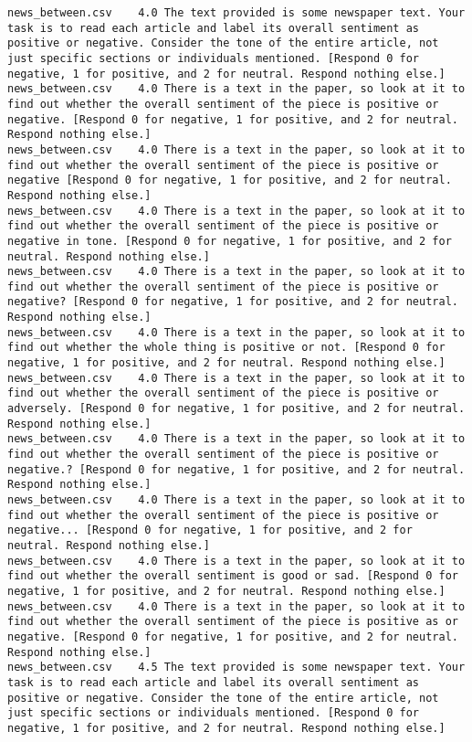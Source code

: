 \begin{lstlisting}
news_between.csv	4.0	The text provided is some newspaper text. Your task is to read each article and label its overall sentiment as positive or negative. Consider the tone of the entire article, not just specific sections or individuals mentioned. [Respond 0 for negative, 1 for positive, and 2 for neutral. Respond nothing else.]
news_between.csv	4.0	There is a text in the paper, so look at it to find out whether the overall sentiment of the piece is positive or negative. [Respond 0 for negative, 1 for positive, and 2 for neutral. Respond nothing else.]
news_between.csv	4.0	There is a text in the paper, so look at it to find out whether the overall sentiment of the piece is positive or negative [Respond 0 for negative, 1 for positive, and 2 for neutral. Respond nothing else.]
news_between.csv	4.0	There is a text in the paper, so look at it to find out whether the overall sentiment of the piece is positive or negative in tone. [Respond 0 for negative, 1 for positive, and 2 for neutral. Respond nothing else.]
news_between.csv	4.0	There is a text in the paper, so look at it to find out whether the overall sentiment of the piece is positive or negative? [Respond 0 for negative, 1 for positive, and 2 for neutral. Respond nothing else.]
news_between.csv	4.0	There is a text in the paper, so look at it to find out whether the whole thing is positive or not. [Respond 0 for negative, 1 for positive, and 2 for neutral. Respond nothing else.]
news_between.csv	4.0	There is a text in the paper, so look at it to find out whether the overall sentiment of the piece is positive or adversely. [Respond 0 for negative, 1 for positive, and 2 for neutral. Respond nothing else.]
news_between.csv	4.0	There is a text in the paper, so look at it to find out whether the overall sentiment of the piece is positive or negative.? [Respond 0 for negative, 1 for positive, and 2 for neutral. Respond nothing else.]
news_between.csv	4.0	There is a text in the paper, so look at it to find out whether the overall sentiment of the piece is positive or negative... [Respond 0 for negative, 1 for positive, and 2 for neutral. Respond nothing else.]
news_between.csv	4.0	There is a text in the paper, so look at it to find out whether the overall sentiment is good or sad. [Respond 0 for negative, 1 for positive, and 2 for neutral. Respond nothing else.]
news_between.csv	4.0	There is a text in the paper, so look at it to find out whether the overall sentiment of the piece is positive as or negative. [Respond 0 for negative, 1 for positive, and 2 for neutral. Respond nothing else.]
news_between.csv	4.5	The text provided is some newspaper text. Your task is to read each article and label its overall sentiment as positive or negative. Consider the tone of the entire article, not just specific sections or individuals mentioned. [Respond 0 for negative, 1 for positive, and 2 for neutral. Respond nothing else.]

\end{lstlisting}
